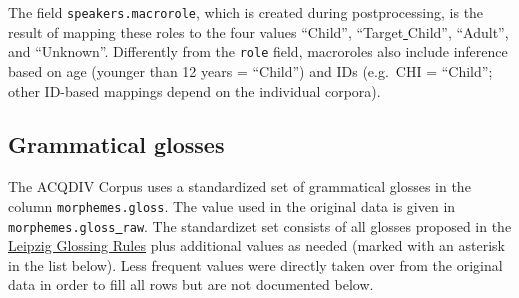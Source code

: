 \documentclass[a4paper, 11pt]{book}
\newcommand{\und}{\underline{{ }}\hspace{0.2mm}}	%
\begin{document}
The field \texttt{speakers.macrorole}, which is created during postprocessing, is the result of mapping these roles to the four values “Child”, “Target\und Child”, “Adult”, and “Unknown”. Differently from the \texttt{role} field, macroroles also include inference based on age (younger than 12 years = “Child”) and IDs (e.g.\ CHI = “Child”; other ID-based mappings depend on the individual corpora). 


\subsection{Grammatical glosses}
\label{subsec:Grammatical glosses}

The ACQDIV Corpus uses a standardized set of grammatical glosses in the column \texttt{morphemes.gloss}. The value used in the original data is given in \texttt{morphemes.gloss\und raw}. The standardizet set consists of all glosses proposed in the \href{http://www.eva.mpg.de/lingua/resources/glossing-rules.php}{Leipzig Glossing Rules} plus additional values as needed (marked with an asterisk in the list below). Less frequent values were directly taken over from the original data in order to fill all rows but are not documented below. 
\end{document}
